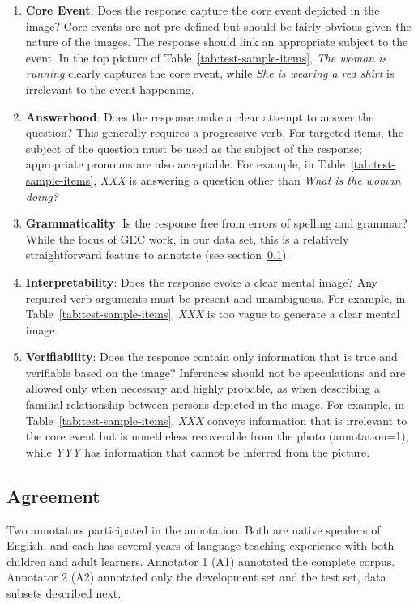 \documentclass[11pt,a4paper]{article}
\begin{document}
\begin{enumerate}
\item \textbf{Core Event}: Does the response capture the core event depicted in the image? Core events are not pre-defined but should be fairly obvious given the nature of the images. The response should link an appropriate subject to the event.  In the top picture of Table~\ref{tab:test-sample-items}, \textit{The woman is running} clearly captures the core event, while \textit{She is wearing a red shirt} is irrelevant to the event happening.
\item \textbf{Answerhood}: Does the response make a clear attempt to answer the question? This generally requires a progressive verb. For targeted items, the subject of the question must be used as the subject of the response; appropriate pronouns are also acceptable.  For example, in Table~\ref{tab:test-sample-items}, \textit{XXX} is answering a question other than \textit{What is the woman doing?}
\item \textbf{Grammaticality}: Is the response free from errors of spelling and grammar?  While the focus of GEC work, in our data set, this is a relatively straightforward feature to annotate (see section~\ref{sec:agreement}).
\item \textbf{Interpretability}: Does the response evoke a clear mental image? Any required verb arguments must be present and unambiguous.  For example, in Table~\ref{tab:test-sample-items}, \textit{XXX} is too vague to generate a clear mental image.
\item \textbf{Verifiability}: Does the response contain only information that is true and verifiable based on the image? Inferences should not be speculations and are allowed only when necessary and highly probable, as when describing a familial relationship between persons depicted in the image.  For example, in Table~\ref{tab:test-sample-items}, \textit{XXX} conveys information that is irrelevant to the core event but is nonetheless recoverable from the photo (annotation=1), while \textit{YYY} has information that cannot be inferred from the picture.
\end{enumerate}

\subsection{Agreement}
\label{sec:agreement}
Two annotators participated in the annotation. Both are native speakers of English, and each has several years of language teaching experience with both children and adult learners. Annotator 1 (A1) annotated the complete corpus. Annotator 2 (A2) annotated only the development set and the test set, data subsets described next.
\end{document}
